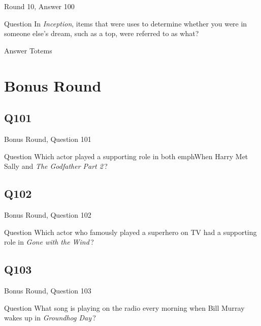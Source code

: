 \documentclass[11pt]{beamer}
\begin{document}
\begin{frame}[t]{Round 10, Answer 100}
\vspace{2em}
\begin{block}{Question}
In \emph{Inception}, items that were uses to determine whether you were in someone else's dream, such as a top, were referred to as what?
\end{block}
\pause{}
\begin{block}{Answer}
Totems
\end{block}
\end{frame}
    

\section{Bonus Round}
    

\subsection*{Q101}
\begin{frame}[t]{Bonus Round, Question 101}
\vspace{2em}
\begin{block}{Question}
Which actor played a supporting role in both emph{When Harry Met Sally} and \emph{The Godfather Part 2}\,?
\end{block}
\end{frame}
    

\subsection*{Q102}
\begin{frame}[t]{Bonus Round, Question 102}
\vspace{2em}
\begin{block}{Question}
Which actor who famously played a superhero on TV had a supporting role in \emph{Gone with the Wind}\,?
\end{block}
\end{frame}
    

\subsection*{Q103}
\begin{frame}[t]{Bonus Round, Question 103}
\vspace{2em}
\begin{block}{Question}
What song is playing on the radio every morning when Bill Murray wakes up in \emph{Groundhog Day}\,?
\end{block}
\end{frame}
    
\end{document}
